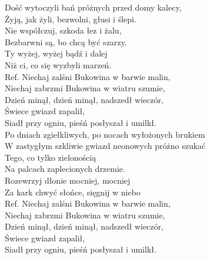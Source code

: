 {}

\begin{flushleft}
Dość wytoczyli bań próżnych przed domy kalecy, \\
Żyją, jak żyli, bezwolni, głusi i ślepi. \tab{}\\
Nie współczuj, szkoda łez i żalu, \tab{}\\
Bezbarwni są, bo chcą być szarzy. \tab{}\\
Ty wyżej, wyżej bądź i dalej \tab{}\tab{}\\
Niż ci, co się wyzbyli marzeń. \tab{}\tab{}\\
\vskip 3mm
Ref. Niechaj zalśni Bukowina w barwie malin, \tab{}\\
\hspace{0.9cm}Niechaj zabrzmi Bukowina w wiatru szumie, \\
\hspace{0.9cm}Dzień minął, dzień minął, nadszedł wieczór, \\
\hspace{0.9cm}Świece gwiazd zapalił, \tab{}\tab{}\\
\hspace{0.9cm}Siadł przy ogniu, pieśń posłyszał i umilkł. \\
\vskip 3mm
Po dniach zgiełkliwych, po nocach wyłożonych brukiem \\
W zastygłym szkliwie gwiazd neonowych próżno szukać \\
Tego, co tylko zielonością \\
Na palcach zaplecionych drzemie. \\
Rozewrzyj dłonie mocniej, mocniej \\
Za kark chwyć słońce, sięgnij w niebo \\
\vskip 3mm
Ref. Niechaj zalśni Bukowina w barwie malin, \\
\hspace{0.9cm}Niechaj zabrzmi Bukowina w wiatru szumie, \\
\hspace{0.9cm}Dzień minął, dzień minął, nadszedł wieczór, \\
\hspace{0.9cm}Świece gwiazd zapalił, \\
\hspace{0.9cm}Siadł przy ogniu, pieśń posłyszał i umilkł. \\

\end{flushleft}
